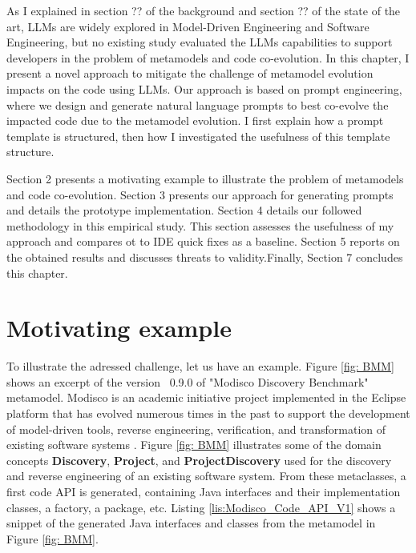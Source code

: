 As I explained in section ?? of the background and section ?? of the state of the art, LLMs are widely explored in Model-Driven Engineering and Software Engineering, but no existing study evaluated the LLMs capabilities 
to support developers in the problem of metamodels and code co-evolution. 
In this chapter, I present a novel approach to mitigate the challenge of metamodel evolution impacts on the code using LLMs. 
Our approach is based on prompt engineering, where we design and generate natural language prompts to best co-evolve the impacted code due to the metamodel evolution. I first explain how a prompt template is structured, then how I investigated the usefulness of this template structure. 

  Section 2 presents a motivating example to illustrate the problem of metamodels and code co-evolution. Section 3 presents our approach for generating prompts and details the prototype implementation.  Section 4 details our followed methodology in this empirical study. This section assesses the usefulness of my approach and compares ot to IDE quick fixes as a baseline. Section 5 reports on the obtained results and discusses threats to validity.Finally, Section 7 concludes this chapter. 

\section{Motivating example}
\label{example}


To illustrate the adressed challenge, let us have an example. 
Figure \ref{fig: BMM} shows an excerpt of the  version ~0.9.0 of "Modisco Discovery Benchmark" metamodel. %
Modisco is an academic initiative project implemented in the Eclipse platform that has evolved numerous times in the past to support the development of model-driven tools, reverse engineering, verification, and transformation of existing software systems \cite{bruneliere2010modisco,bruneliere2014modisco}.
Figure \ref{fig: BMM} illustrates  some of the domain concepts \textbf{Discovery}, \textbf{Project}, and \textbf{ProjectDiscovery}  used for the discovery and reverse engineering of an existing software system. 
From these metaclasses, a first code API is generated, containing Java interfaces and their implementation classes, a factory, a package, etc. %
Listing \ref{lis:Modisco_Code_API_V1} shows a snippet of the generated Java interfaces and classes from the metamodel in Figure \ref{fig: BMM}. 

